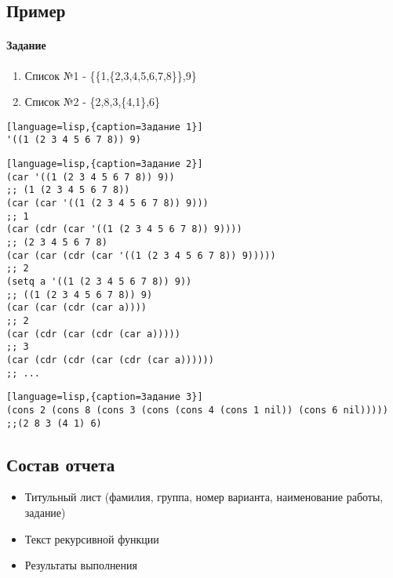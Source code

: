 \documentclass[a4paper,12pt]{article}
\begin{document}
\subsection{Пример}
\paragraph{Задание}
\begin{enumerate}
	\item Список №1 - \{\{1,\{2,3,4,5,6,7,8\}\},9\}
	\item Список №2 - \{2,8,3,\{4,1\},6\}
\end{enumerate}

\begin{lstlisting}[language=lisp,{caption=Задание 1}]
'((1 (2 3 4 5 6 7 8)) 9)
\end{lstlisting}

\begin{lstlisting}[language=lisp,{caption=Задание 2}]
(car '((1 (2 3 4 5 6 7 8)) 9))
;; (1 (2 3 4 5 6 7 8))
(car (car '((1 (2 3 4 5 6 7 8)) 9)))
;; 1
(car (cdr (car '((1 (2 3 4 5 6 7 8)) 9))))
;; (2 3 4 5 6 7 8)
(car (car (cdr (car '((1 (2 3 4 5 6 7 8)) 9)))))
;; 2
(setq a '((1 (2 3 4 5 6 7 8)) 9))
;; ((1 (2 3 4 5 6 7 8)) 9)
(car (car (cdr (car a))))
;; 2
(car (cdr (car (cdr (car a)))))
;; 3
(car (cdr (cdr (car (cdr (car a))))))
;; ...
\end{lstlisting}

\begin{lstlisting}[language=lisp,{caption=Задание 3}]
(cons 2	(cons 8 (cons 3 (cons (cons 4 (cons 1 nil)) (cons 6 nil)))))
;;(2 8 3 (4 1) 6)
\end{lstlisting}

\subsection{Состав отчета}
\begin{itemize}
	\item Титульный лист (фамилия, группа, номер варианта, наименование работы, задание)
	\item Текст рекурсивной функции
	\item Результаты выполнения
\end{itemize}
\end{document}

